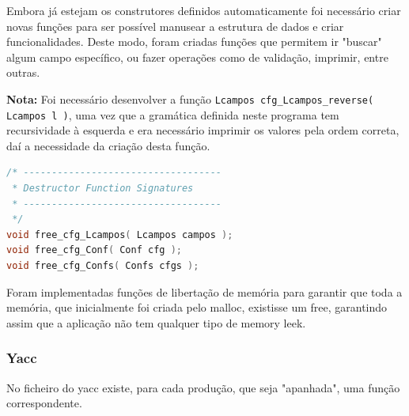 \documentclass[11pt, a4paper, oneside]{article}
\begin{document}
Embora já estejam os construtores definidos automaticamente foi necessário criar novas funções para ser possível manusear a estrutura de dados e criar funcionalidades. Deste modo, foram criadas funções que permitem ir "buscar" algum campo específico, ou fazer operações como de validação, imprimir, entre outras.

\textbf{Nota:} Foi necessário desenvolver a função \texttt{Lcampos cfg\_Lcampos\_reverse( Lcampos l )}, uma vez que a gramática definida neste programa tem recursividade à esquerda e era necessário imprimir os valores pela ordem correta, daí a necessidade da criação desta função.
\newpage
\begin{lstlisting}[language=C, caption={Funções de libertação de memória.}]
/* -----------------------------------
 * Destructor Function Signatures
 * -----------------------------------
 */
void free_cfg_Lcampos( Lcampos campos );
void free_cfg_Conf( Conf cfg );
void free_cfg_Confs( Confs cfgs );
\end{lstlisting} 

Foram implementadas funções de libertação de memória para garantir que toda a memória, que inicialmente foi criada pelo malloc, existisse um free, garantindo assim que a aplicação não tem qualquer tipo de memory leek.

\newpage
\subsubsection{\textsf{Yacc}}
No ficheiro do \textsf{yacc} existe, para cada produção, que seja "apanhada", uma função correspondente.
\end{document}
